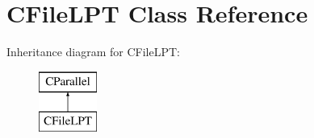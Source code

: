 \hypertarget{classCFileLPT}{\section{C\-File\-L\-P\-T Class Reference}
\label{classCFileLPT}
}
Inheritance diagram for C\-File\-L\-P\-T\-:\begin{figure}[H]
\begin{center}
\leavevmode
\includegraphics[height=2.000000cm]{classCFileLPT}
\end{center}
\end{figure}
